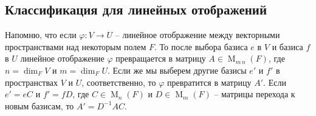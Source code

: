 \subsection{Классификация для линейных отображений}

Напомню, что если $\varphi \colon V\to U$ -- линейное отображение между векторными пространствами над некоторым полем $F$.
То после выбора базиса $e$ в $V$ и базиса $f$ в $U$ линейное отображение $\varphi$ превращается в матрицу $A\in \operatorname{M}_{m\,n}(F)$, где $n = \dim_F V$ и $m = \dim_F U$.
Если же мы выберем другие базисы $e'$ и $f'$ в пространствах $V$ и $U$, соответственно, то $\varphi$ превратится в матрицу $A'$.
Если $e' = eC$ и $f' = fD$, где $C\in \operatorname{M}_n(F)$ и $D\in\operatorname{M}_m(F)$ -- матрицы перехода к новым базисам, то $A' = D^{-1}A C$.


